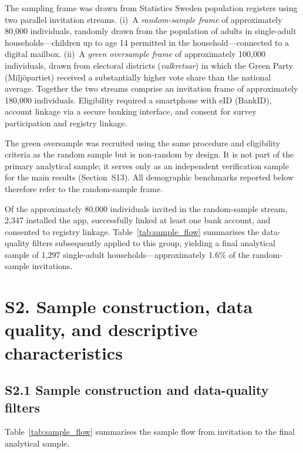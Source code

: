 \documentclass[12pt]{article}
\begin{document}
The sampling frame was drawn from Statistics Sweden population registers using two parallel invitation streams. (i)~A \emph{random-sample frame} of
approximately 80{,}000 individuals, randomly drawn from the population of adults in single-adult households---children up to age 14 permitted in the household---connected to a digital mailbox. (ii)~A \emph{green oversample frame} of approximately 100{,}000 individuals, drawn from electoral districts (\emph{valkretsar}) in which the Green Party (Milj\"opartiet) received a substantially higher vote share than the national average. Together the two streams comprise an invitation frame of approximately 180{,}000 individuals. Eligibility required a smartphone with eID (BankID), account linkage via a secure banking interface, and consent for survey participation and registry linkage.

The green oversample was recruited using the same procedure and eligibility criteria as the random sample but is non-random by design. It is not part of the primary analytical sample; it serves only as an independent verification sample for the main results (Section~S13). All demographic benchmarks reported below therefore refer to the random-sample frame.

Of the approximately 80{,}000 individuals invited in the random-sample stream, 2{,}347 installed the app, successfully linked at least one bank account, and consented to registry linkage. Table~\ref{tab:sample_flow} summarises the data-quality filters subsequently applied to this group, yielding a final analytical sample of 1{,}297 single-adult households---approximately 1.6\% of the random-sample invitations.

\section*{S2. Sample construction, data quality, and descriptive characteristics}

\subsection*{S2.1 Sample construction and data-quality filters}
Table~\ref{tab:sample_flow} summarises the sample flow from invitation to the final analytical sample. 
\end{document}
